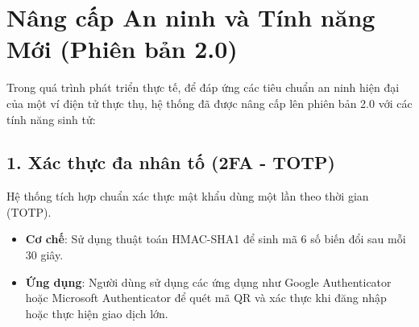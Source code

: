 \documentclass[11pt,a4paper]{article}
\begin{document}
\begin{algorithm}[H]
\SetAlgoLined
{}
\caption{verify\_totp - Xác thực đa nhân tố 2FA}
\end{algorithm}

\begin{algorithm}[H]
\SetAlgoLined
{}
\caption{check\_lockout - Chống tấn công Brute-force}
\end{algorithm}

\begin{algorithm}[H]
\SetAlgoLined
{}
\caption{verify\_payment\_pin - Xác thực PIN Thanh toán}
\end{algorithm}

\section{Nâng cấp An ninh và Tính năng Mới (Phiên bản 2.0)}
Trong quá trình phát triển thực tế, để đáp ứng các tiêu chuẩn an ninh hiện đại của một ví điện tử thực thụ, hệ thống đã được nâng cấp lên phiên bản 2.0 với các tính năng sinh tử:

\subsection{1. Xác thực đa nhân tố (2FA - TOTP)}
Hệ thống tích hợp chuẩn xác thực mật khẩu dùng một lần theo thời gian (TOTP). 
\begin{itemize}
    \item \textbf{Cơ chế}: Sử dụng thuật toán HMAC-SHA1 để sinh mã 6 số biến đổi sau mỗi 30 giây.
    \item \textbf{Ứng dụng}: Người dùng sử dụng các ứng dụng như Google Authenticator hoặc Microsoft Authenticator để quét mã QR và xác thực khi đăng nhập hoặc thực hiện giao dịch lớn.
\end{itemize}
\end{document}
